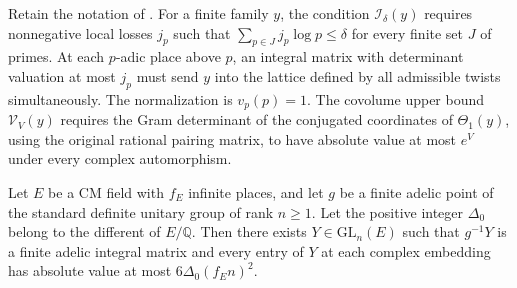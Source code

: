Retain the notation of . For a finite family $y$, the condition $\mathcal I_\delta(y)$ requires nonnegative local losses $j_p$ such that $\sum_{p\in J}j_p\log p\le\delta$ for every finite set $J$ of primes. At each $p$-adic place above $p$, an integral matrix with determinant valuation at most $j_p$ must send $y$ into the lattice defined by all admissible twists simultaneously. The normalization is $v_p(p)=1$. The covolume upper bound $\mathcal V_V(y)$ requires the Gram determinant of the conjugated coordinates of $\Theta_1(y)$, using the original rational pairing matrix, to have absolute value at most $e^V$ under every complex automorphism.

\begin{lemma}
\label{lem:a-unitary-lattice-basis}
\emitthmsource
Let $E$ be a CM field with $f_E$ infinite places, and let $g$ be a finite adelic point of the standard definite unitary group of rank $n\ge1$. Let the positive integer $\Delta_0$ belong to the different of $E/\mathbb Q$. Then there exists $Y\in\mathrm{GL}_n(E)$ such that $g^{-1}Y$ is a finite adelic integral matrix and every entry of $Y$ at each complex embedding has absolute value at most $6\Delta_0(f_E n)^2$.
\end{lemma}
